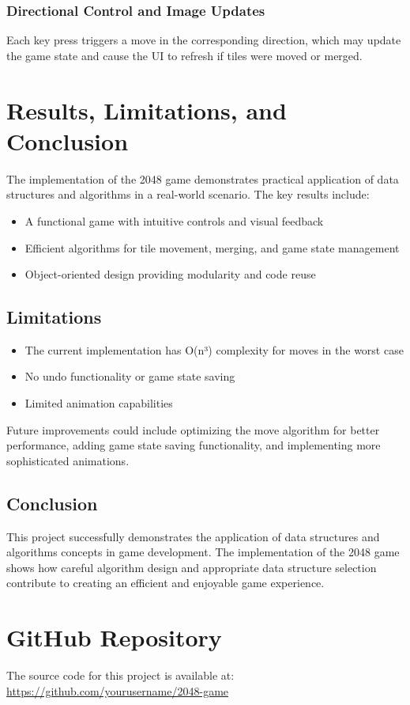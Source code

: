 \documentclass[12pt, a4paper]{article}
\begin{document}
\subsubsection{Directional Control and Image Updates}
Each key press triggers a move in the corresponding direction, which may update the game state and cause the UI to refresh if tiles were moved or merged.

\section{Results, Limitations, and Conclusion}
The implementation of the 2048 game demonstrates practical application of data structures and algorithms in a real-world scenario. The key results include:
\begin{itemize}
    \item A functional game with intuitive controls and visual feedback
    \item Efficient algorithms for tile movement, merging, and game state management
    \item Object-oriented design providing modularity and code reuse
\end{itemize}

\subsection{Limitations}
\begin{itemize}
    \item The current implementation has O(n³) complexity for moves in the worst case
    \item No undo functionality or game state saving
    \item Limited animation capabilities
\end{itemize}

Future improvements could include optimizing the move algorithm for better performance, adding game state saving functionality, and implementing more sophisticated animations.

\subsection{Conclusion}
This project successfully demonstrates the application of data structures and algorithms concepts in game development. The implementation of the 2048 game shows how careful algorithm design and appropriate data structure selection contribute to creating an efficient and enjoyable game experience.

\section{GitHub Repository}
The source code for this project is available at: \url{https://github.com/yourusername/2048-game}
\end{document}

